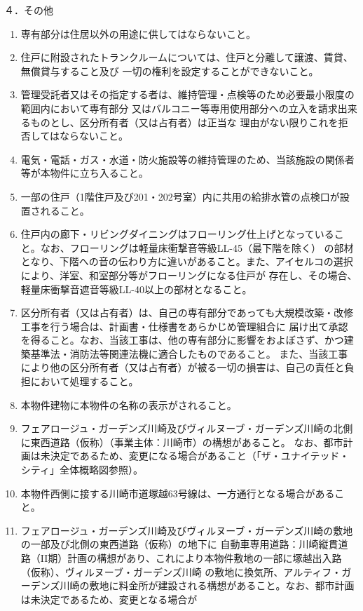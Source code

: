 \documentclass[
  luatex,
  paper=a4paper,
  fontsize=11pt,
  jafontsize=11pt,
  jlreq_notes,
]{jlreq}
\begin{document}
  ４．その他
  \begin{enumerate}
  \item 専有部分は住居以外の用途に供してはならないこと。
  \item 住戸に附設されたトランクルームについては、住戸と分離して譲渡、賃貸、無償貸与すること及び
        一切の権利を設定することができないこと。
  \item 管理受託者又はその指定する者は、維持管理・点検等のため必要最小限度の範囲内において専有部分
        又はバルコニー等専用使用部分への立入を請求出来るものとし、区分所有者（又は占有者）は正当な
        理由がない限りこれを拒否してはならないこと。
  \item 電気・電話・ガス・水道・防火施設等の維持管理のため、当該施設の関係者等が本物件に立ち入ること。
  \item 一部の住戸（1階住戸及び201・202号室）内に共用の給排水管の点検口が設置されること。
  \item 住戸内の廊下・リビングダイニングはフローリング仕上げとなっていること。なお、フローリングは軽量床衝撃音等級LL-45（最下階を除く）
        の部材となり、下階への音の伝わり方に違いがあること。また、アイセルコの選択により、洋室、和室部分等がフローリングになる住戸が
        存在し、その場合、軽量床衝撃音遮音等級LL-40以上の部材となること。
  \item 区分所有者（又は占有者）は、自己の専有部分であっても大規模改築・改修工事を行う場合は、計画書・仕様書をあらかじめ管理組合に
        届け出て承認を得ること。なお、当該工事は、他の専有部分に影響をおよぼさず、かつ建築基準法・消防法等関連法機に適合したものであること。
        また、当該工事により他の区分所有者（又は占有者）が被る一切の損害は、自己の責任と負担において処理すること。
  \item 本物件建物に本物件の名称の表示がされること。
  \item フェアロージュ・ガーデンズ川崎及びヴィルヌーブ・ガーデンズ川崎の北側に東西道路（仮称）（事業主体：川崎市）の構想があること。
        なお、都市計画は未決定であるため、変更になる場合があること（「ザ・ユナイテッド・シティ」全体概略図参照）。
  \item 本物件西側に接する川崎市道塚越63号線は、一方通行となる場合があること。
  \item フェアロージュ・ガーデンズ川崎及びヴィルヌーブ・ガーデンズ川崎の敷地の一部及び北側の東西道路（仮称）の地下に
        自動車専用道路：川崎縦貫道路（II期）計画の構想があり、これにより本物件敷地の一部に塚越出入路（仮称）、ヴィルヌーブ・ガーデンズ川崎
        の敷地に換気所、アルティフ・ガーデンズ川崎の敷地に料金所が建設される構想があること。なお、都市計画は未決定であるため、変更となる場合が

\end{enumerate}
\end{document}
